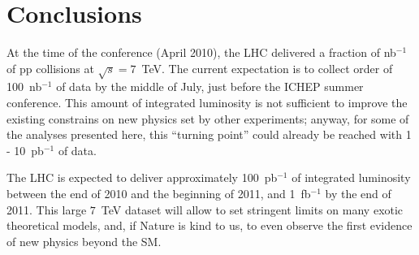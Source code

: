 \documentclass{PoS}
\begin{document}
\section{Conclusions}
At the time of the conference (April 2010), the LHC delivered a fraction of nb$^{-1}$ 
of pp collisions at $\sqrt{s} = 7$~TeV. The current expectation 
is to collect order of 100~nb$^{-1}$ of data by the middle of July, just before 
the ICHEP summer conference. This amount of integrated luminosity is not  
sufficient to improve the existing constrains on new physics set by other experiments; 
anyway, for some of the analyses presented here, this ``turning point'' could 
already be reached with 1 - 10~pb$^{-1}$ of data.

The LHC is expected to deliver approximately 100~pb$^{-1}$ of integrated luminosity 
between the end of 2010 and the beginning of 2011, and 1~fb$^{-1}$ by the end of 2011. 
This large $7$~TeV dataset will allow to set stringent limits 
on many exotic theoretical models, and, if Nature is kind to us, 
to even observe the first evidence of new physics beyond the SM.
\end{document}
